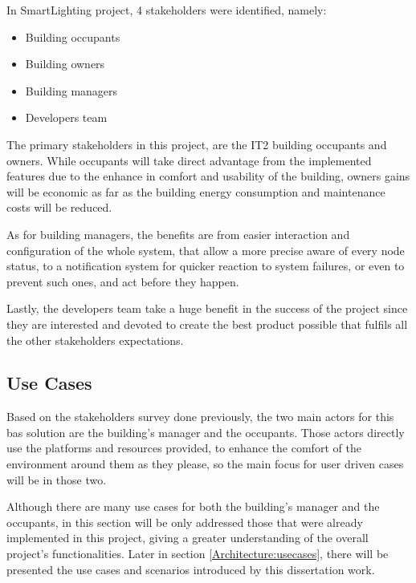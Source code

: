 In SmartLighting project, 4 stakeholders were identified, namely:

\begin{itemize}
	\item Building occupants
	\item Building owners
	\item Building managers
	\item Developers team
\end{itemize}


The primary stakeholders in this project, are the IT2 building occupants and owners. While occupants will take direct advantage from the implemented features due to the enhance in comfort and usability of the building, owners gains will be economic as far as the building energy consumption and maintenance costs will be reduced.

As for building managers, the benefits are from easier interaction and configuration of the whole system, that allow a more precise aware of every node status, to a notification system for quicker reaction to system failures, or even to prevent such ones, and act before they happen.

Lastly, the developers team take a huge benefit in the success of the project since they are interested and devoted to create the best product possible that fulfils all the other stakeholders expectations.


\subsection{Use Cases}
\label{Architecture:SLusecases}

Based on the stakeholders survey done previously, the two main actors for this \ac{bas} solution are the building's manager and the occupants. Those actors directly use the platforms and resources provided, to enhance the comfort of the environment around them as they please, so the main focus for user driven cases will be in those two. 

Although there are many use cases for both the building's manager and the occupants, in this section will be only addressed those that were already implemented in this project, giving a greater understanding of the overall project's functionalities. Later in section \ref{Architecture:usecases}, there will be presented the use cases and scenarios introduced by this dissertation work.


